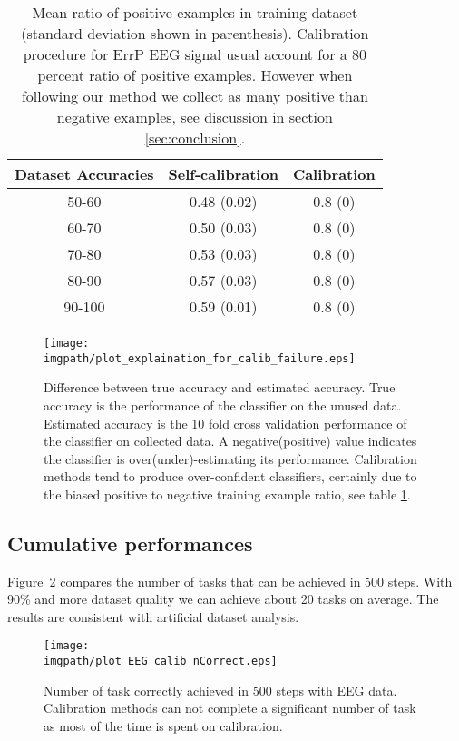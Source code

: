 \begin{table}
\centering
\begin{tabular}{c c c}
Dataset Accuracies & Self-calibration & Calibration \\ \hline
50-60 & 0.48 (0.02) & 0.8 (0) \\
60-70 & 0.50 (0.03) & 0.8 (0) \\
70-80 & 0.53 (0.03) & 0.8 (0) \\
80-90 & 0.57 (0.03) & 0.8 (0) \\
90-100 & 0.59 (0.01) & 0.8 (0) \\
\end{tabular}
\caption{Mean ratio of positive examples in training dataset (standard deviation shown in parenthesis). Calibration procedure for ErrP EEG signal usual account for a 80 percent ratio of positive examples. However when following our method we collect as many positive than negative examples, see discussion in section \ref{sec:conclusion}.}
\label{tab:correctLabelRatio}
\end{table}

\begin{figure}[!ht]
\centering
\texttt{[image: \\imgpath/plot\_explaination\_for\_calib\_failure.eps]}
\caption{Difference between true accuracy and estimated accuracy. True accuracy is the performance of the classifier on the unused data. Estimated accuracy is the 10 fold cross validation performance of the classifier on collected data. A negative(positive) value indicates the classifier is over(under)-estimating its performance. Calibration methods tend to produce over-confident classifiers, certainly due to the biased positive to negative training example ratio, see table \ref{tab:correctLabelRatio}.}
\label{fig:calibFail}
\end{figure}

\subsection{Cumulative performances}

Figure~\ref{fig:nCorrectEEG} compares the number of tasks that can be achieved in 500 steps. With 90\% and more dataset quality we can achieve about 20 tasks on average. The results are consistent with artificial dataset analysis.

\begin{figure}[!ht]
\centering
\texttt{[image: \\imgpath/plot\_EEG\_calib\_nCorrect.eps]}
\caption{Number of task correctly achieved in 500 steps with EEG data. Calibration methods can not complete a significant number of task as most of the time is spent on calibration.}
\label{fig:nCorrectEEG}
\end{figure} 

